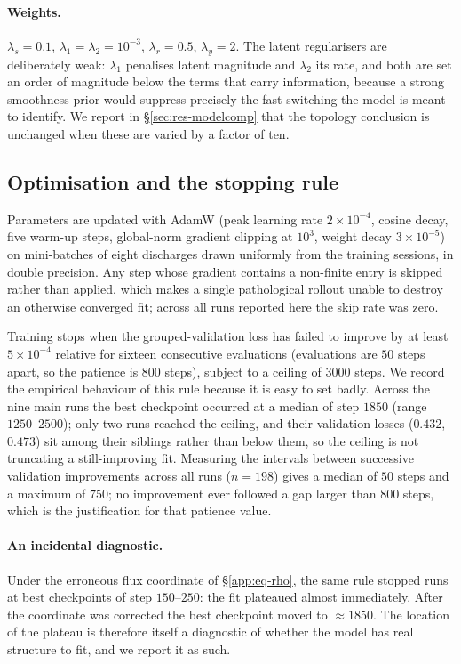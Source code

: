 \paragraph{Weights.} $\lambda_s = 0.1$, $\lambda_1 = \lambda_2 = 10^{-3}$,
$\lambda_r = 0.5$, $\lambda_y = 2$. The latent regularisers are deliberately
weak: $\lambda_1$ penalises latent magnitude and $\lambda_2$ its rate, and
both are set an order of magnitude below the terms that carry information,
because a strong smoothness prior would suppress precisely the fast
switching the model is meant to identify. We report in
\S\ref{sec:res-modelcomp} that the topology conclusion is unchanged when
these are varied by a factor of ten.

\subsection{Optimisation and the stopping rule}
\label{sec:ident-opt}

Parameters are updated with AdamW (peak learning rate $2\times10^{-4}$,
cosine decay, five warm-up steps, global-norm gradient clipping at
$10^{3}$, weight decay $3\times10^{-5}$) on mini-batches of eight
discharges drawn uniformly from the training sessions, in double precision.
Any step whose gradient contains a non-finite entry is skipped rather than
applied, which makes a single pathological rollout unable to destroy an
otherwise converged fit; across all runs reported here the skip rate was
zero.

Training stops when the grouped-validation loss has failed to improve by at
least $5\times10^{-4}$ relative for sixteen consecutive evaluations
(evaluations are $50$ steps apart, so the patience is $800$ steps), subject
to a ceiling of $3000$ steps. We record the empirical behaviour of this rule
because it is easy to set badly. Across the nine main runs the best
checkpoint occurred at a median of step $1850$ (range $1250$--$2500$); only
two runs reached the ceiling, and their validation losses ($0.432$, $0.473$)
sit among their siblings rather than below them, so the ceiling is not
truncating a still-improving fit. Measuring the intervals between successive
validation improvements across all runs ($n = 198$) gives a median of $50$
steps and a maximum of $750$; no improvement ever followed a gap larger than
$800$ steps, which is the justification for that patience value.

\paragraph{An incidental diagnostic.} Under the erroneous flux coordinate of
\S\ref{app:eq-rho}, the same rule stopped runs at best checkpoints of step
$150$--$250$: the fit plateaued almost immediately. After the coordinate was
corrected the best checkpoint moved to $\approx 1850$. The location of the
plateau is therefore itself a diagnostic of whether the model has real
structure to fit, and we report it as such.

